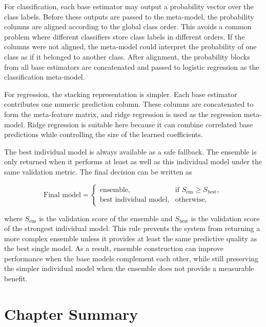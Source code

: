 \documentclass[12pt,a4paper,oneside]{report}
\begin{document}
\noindent For classification, each base estimator may output a probability vector over the
class labels. Before these outputs are passed to the meta-model, the probability
columns are aligned according to the global class order. This avoids a common
problem where different classifiers store class labels in different orders. If
the columns were not aligned, the meta-model could interpret the probability of
one class as if it belonged to another class. After alignment, the probability
blocks from all base estimators are concatenated and passed to logistic
regression as the classification meta-model.

\noindent For regression, the stacking representation is simpler. Each base estimator
contributes one numeric prediction column. These columns are concatenated to
form the meta-feature matrix, and ridge regression is used as the regression
meta-model. Ridge regression is suitable here because it can combine correlated
base predictions while controlling the size of the learned coefficients.

\noindent The best individual model is always available as a safe fallback. The ensemble
is only returned when it performs at least as well as this individual model under
the same validation metric. The final decision can be written as

\[
\text{Final model} =
\begin{cases}
\text{ensemble}, & \text{if } S_{\text{ens}} \geq S_{\text{best}}, \\
\text{best individual model}, & \text{otherwise},
\end{cases}
\]

\noindent where \(S_{\text{ens}}\) is the validation score of the ensemble and
\(S_{\text{best}}\) is the validation score of the strongest individual model.
This rule prevents the system from returning a more complex ensemble unless it
provides at least the same predictive quality as the best single model. As a
result, ensemble construction can improve performance when the base models
complement each other, while still preserving the simpler individual model when
the ensemble does not provide a measurable benefit.




\section{Chapter Summary}
\end{document}
